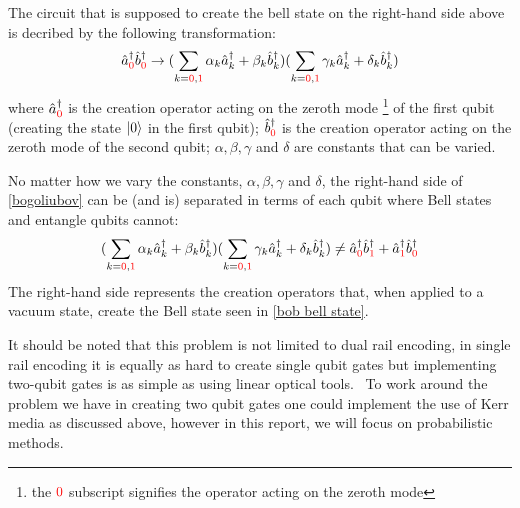 The circuit that is supposed to create the bell state on the right-hand side above is decribed by the following transformation:
\begin{equation} \label{bogoliubov}
    \hat{a}^{\dag}_{\color{red}0}\hat{b}^{\dag}_{\color{red}0} \rightarrow (\sum\limits_{k={\color{red}0},{\color{red}1}}\alpha_k\hat{a}^{\dag}_k + \beta_k\hat{b}^{\dag}_k)(\sum\limits_{k={\color{red}0},{\color{red}1}}\gamma_k\hat{a}^{\dag}_k + \delta_k\hat{b}^{\dag}_k)
\end{equation}
where $\hat{a}^\dag_{\color{red}0}$ is the creation operator acting on the zeroth mode \footnote{the ${\color{red}0}$ subscript signifies the operator acting on the zeroth mode} of the first qubit (creating the state $\ket{0}$ in the first qubit); $\hat{b}^\dag_{\color{red}0}$ is the creation operator acting on the zeroth mode of the second qubit; $\alpha, \beta, \gamma$ and $\delta$ are constants that can be varied.
\par
No matter how we vary the constants,  $\alpha, \beta, \gamma$ and $\delta$, the right-hand side of \ref{bogoliubov} can be (and is) separated in terms of each qubit where Bell states and entangle qubits cannot:
\begin{equation}
    (\sum\limits_{k={\color{red}0},{\color{red}1}}\alpha_k\hat{a}^{\dag}_k + \beta_k\hat{b}^{\dag}_k)(\sum\limits_{k={\color{red}0},{\color{red}1}}\gamma_k\hat{a}^{\dag}_k + \delta_k\hat{b}^{\dag}_k) \neq \hat{a}^{\dag}_{\color{red}0}\hat{b}^{\dag}_{\color{red}1} + \hat{a}^{\dag}_{\color{red}1}\hat{b}^{\dag}_{\color{red}0}
\end{equation}
The right-hand side represents the creation operators that, when applied to a vacuum state, create the Bell state seen in \ref{bob bell state}.

It should be noted that this problem is not limited to dual rail encoding, in single rail encoding it is equally as hard to create single qubit gates but implementing two-qubit gates is as simple as using linear optical tools.
\
To work around the problem we have in creating two qubit gates one could implement the use of Kerr media as discussed above, however in this report, we will focus on probabilistic methods.


